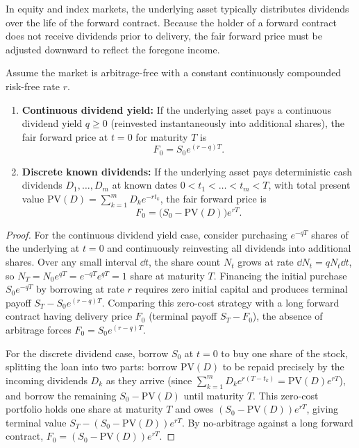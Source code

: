 In equity and index markets, the underlying asset typically distributes dividends over the life of the forward contract. Because the holder of a forward contract does not receive dividends prior to delivery, the fair forward price must be adjusted downward to reflect the foregone income.

\begin{proposition}
\label{prop:forward_dividends}
Assume the market is arbitrage-free with a constant continuously compounded risk-free rate $r$.
\begin{enumerate}
    \item \textbf{Continuous dividend yield:} If the underlying asset pays a continuous dividend yield $q \ge 0$ (reinvested instantaneously into additional shares), the fair forward price at $t = 0$ for maturity $T$ is
    \begin{equation}
    \label{eq:forward_continuous_div}
        F_0 = S_0 e^{(r - q)T}.
    \end{equation}
    \item \textbf{Discrete known dividends:} If the underlying asset pays deterministic cash dividends $D_1, \dots, D_m$ at known dates $0 < t_1 < \dots < t_m < T$, with total present value $\mathrm{PV}(D) = \sum_{k=1}^{m} D_k e^{-r t_k}$, the fair forward price is
    \begin{equation}
    \label{eq:forward_discrete_div}
        F_0 = \bigl(S_0 - \mathrm{PV}(D)\bigr) e^{rT}.
    \end{equation}
\end{enumerate}
\end{proposition}

\begin{proof}
For the continuous dividend yield case, consider purchasing $e^{-qT}$ shares of the underlying at $t = 0$ and continuously reinvesting all dividends into additional shares. Over any small interval $\dd t$, the share count $N_t$ grows at rate $\dd N_t = q N_t \dd t$, so $N_T = N_0 e^{qT} = e^{-qT} e^{qT} = 1$ share at maturity $T$. Financing the initial purchase $S_0 e^{-qT}$ by borrowing at rate $r$ requires zero initial capital and produces terminal payoff $S_T - S_0 e^{(r - q)T}$. Comparing this zero-cost strategy with a long forward contract having delivery price $F_0$ (terminal payoff $S_T - F_0$), the absence of arbitrage forces $F_0 = S_0 e^{(r - q)T}$.

For the discrete dividend case, borrow $S_0$ at $t = 0$ to buy one share of the stock, splitting the loan into two parts: borrow $\mathrm{PV}(D)$ to be repaid precisely by the incoming dividends $D_k$ as they arrive (since $\sum_{k=1}^{m} D_k e^{r(T - t_k)} = \mathrm{PV}(D) e^{rT}$), and borrow the remaining $S_0 - \mathrm{PV}(D)$ until maturity $T$. This zero-cost portfolio holds one share at maturity $T$ and owes $(S_0 - \mathrm{PV}(D)) e^{rT}$, giving terminal value $S_T - (S_0 - \mathrm{PV}(D)) e^{rT}$. By no-arbitrage against a long forward contract, $F_0 = (S_0 - \mathrm{PV}(D)) e^{rT}$.
\end{proof}

